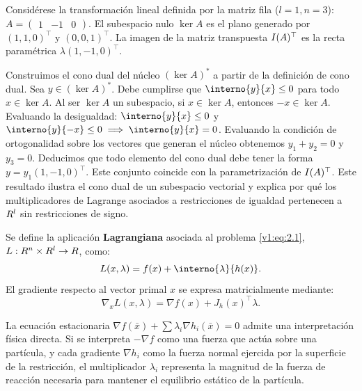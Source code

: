 \begin{example}\label{v1:exa:2.2.1}
 Considérese la transformación lineal definida por la matriz fila ($l = 1, n = 3$): $A = \begin{pmatrix} 1 & -1 & 0 \end{pmatrix}$. El subespacio nulo $\ker A$ es el plano generado por $(1, 1, 0)^\top$ y $(0, 0, 1)^\top$. La imagen de la matriz transpuesta $I (A)^\top$ es la recta paramétrica $\lambda(1, -1, 0)^\top$. 
 
 Construimos el cono dual del núcleo $(\ker A)^*$ a partir de la definición de cono dual. Sea $y \in (\ker A)^*$. Debe cumplirse que $\interno{y}{x} \le 0$ para todo $x \in \ker A$. Al ser $\ker A$ un subespacio, si $x \in \ker A$, entonces $-x \in \ker A$. Evaluando la desigualdad: $\interno{y}{x} \le 0$ y $\interno{y}{-x} \le 0 \implies \interno{y}{x} = 0$. Evaluando la condición de ortogonalidad sobre los vectores que generan el núcleo obtenemos $y_1 + y_2 = 0$ y $y_3 = 0$. Deducimos que todo elemento del cono dual debe tener la forma $y = y_1(1, -1, 0)^\top$. Este conjunto coincide con la parametrización de $I (A)^\top$. Este resultado ilustra el cono dual de un subespacio vectorial y explica por qué los multiplicadores de Lagrange asociados a restricciones de igualdad pertenecen a $R^l$ sin restricciones de signo.
\end{example}

\begin{definition}\label{v1:def:2.2.1}
	Se define la aplicación \textbf{Lagrangiana} asociada al problema \eqref{v1:eq:2.1}, $L : R^n \times R^l \to R$, como:
	\[
		L(x, \lambda) = f(x) + \interno{\lambda}{h(x)}.
	\]
 El gradiente respecto al vector primal $x$ se expresa matricialmente mediante:
	\[
		\nabla_x L(x, \lambda) = \nabla f(x) + J_h(x)^\top \lambda.
	\]
\end{definition}

\begin{notabox}
 La ecuación estacionaria $\nabla f(\bar{x}) + \sum \lambda_i \nabla h_i(\bar{x}) = 0$ admite una interpretación física directa. Si se interpreta $-\nabla f$ como una fuerza que actúa sobre una partícula, y cada gradiente $\nabla h_i$ como la fuerza normal ejercida por la superficie de la restricción, el multiplicador $\lambda_i$ representa la magnitud de la fuerza de reacción necesaria para mantener el equilibrio estático de la partícula.
\end{notabox}

